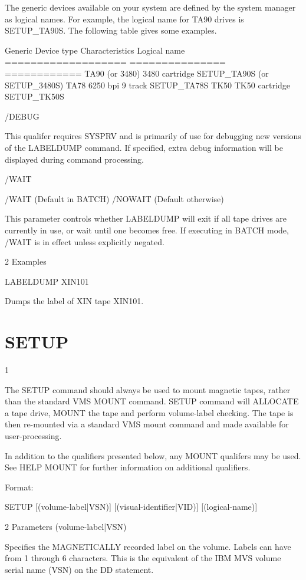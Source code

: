 \begin{XMP}
 The generic devices available on your system are defined by the system
 manager as logical names. For example, the logical name for TA90 drives
 is SETUP_TA90S. The following table gives some examples.

 Generic Device type     Characteristics     Logical name
 ===================     ===============     ============
 TA90 (or 3480)          3480 cartridge      SETUP_TA90S (or SETUP_3480S)
 TA78                    6250 bpi 9 track    SETUP_TA78S
 TK50                    TK50 cartridge      SETUP_TK50S

/DEBUG

 This qualifer requires SYSPRV and is primarily of use for debugging
 new versions of the LABELDUMP command. If specified, extra debug information
 will be displayed during command processing.

/WAIT

   /WAIT     (Default in BATCH)
   /NOWAIT   (Default otherwise)

  This parameter controls whether LABELDUMP will exit if all tape drives
  are currently in use, or wait until one becomes free. If executing
  in BATCH mode, /WAIT is in effect unless explicitly negated.


2 Examples

  LABELDUMP XIN101

  Dumps the label of XIN tape XIN101.
\section{SETUP}
1 

 The SETUP command should always be used to mount magnetic tapes,
 rather than the standard VMS MOUNT command.
 SETUP command will ALLOCATE a tape drive, MOUNT the tape
 and perform volume-label checking. The tape is then re-mounted via a
 standard VMS mount command and made available for user-processing.

 In addition to the qualifiers presented below, any MOUNT qualifers
 may be used. See HELP MOUNT for further information on additional
 qualifiers.


 Format:

      SETUP [(volume-label|VSN)] [(visual-identifier|VID)] [(logical-name)]

2 Parameters
 (volume-label|VSN)

  Specifies the MAGNETICALLY recorded label on the volume.
  Labels can have from 1 through 6 characters. This is the
  equivalent of the IBM MVS volume serial name (VSN) on the DD statement.


\end{XMP}
